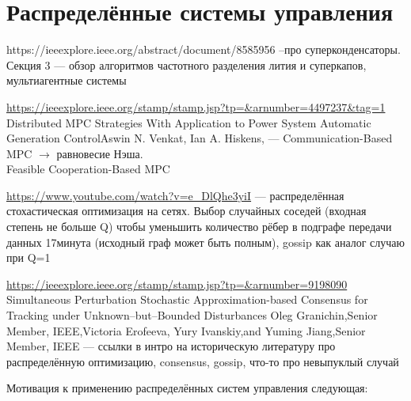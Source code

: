 \section{Распределённые системы управления}
\label{sec:distributed}

https://ieeexplore.ieee.org/abstract/document/8585956 --про суперконденсаторы.
 Секция 3 --- обзор алгоритмов частотного разделения лития и суперкапов, мультиагентные системы

\url{https://ieeexplore.ieee.org/stamp/stamp.jsp?tp=&arnumber=4497237&tag=1}
Distributed MPC Strategies With Application to Power System Automatic Generation ControlAswin N. Venkat,  Ian A. Hiskens, 
--- Communication-Based MPC $\rightarrow$ равновесие Нэша.\\
Feasible Cooperation-Based MPC

\url{https://www.youtube.com/watch?v=e_DlQhe3yiI}
--- распределённая стохастическая оптимизация на сетях.
Выбор случайных соседей (входная степень не больше Q) чтобы уменьшить количество рёбер в подграфе передачи данных 17минута (исходный граф может быть полным), gossip как аналог случаю при Q=1

\url{https://ieeexplore.ieee.org/stamp/stamp.jsp?tp=&arnumber=9198090} Simultaneous Perturbation Stochastic Approximation-based Consensus for Tracking under Unknown–but–Bounded Disturbances Oleg Granichin,Senior Member, IEEE,Victoria Erofeeva, Yury Ivanskiy,and Yuming Jiang,Senior Member, IEEE --- ссылки в интро на историческую литературу про распределённую оптимизацию, consensus, gossip, что-то про невыпуклый случай

Мотивация к применению распределённых систем управления следующая:

